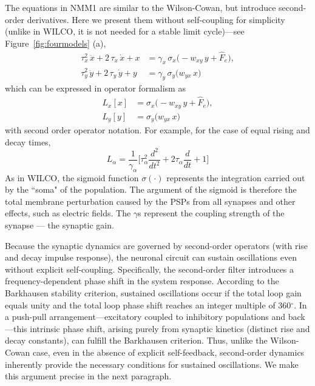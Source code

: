 \documentclass[12pt]{article}
\numberwithin{equation}{section}
\begin{document}
 
The equations in NMM1  are similar to the Wilson-Cowan, but introduce second-order derivatives. Here we present them without self-coupling for simplicity (unlike in WILCO, it is not needed for a stable limit cycle)---see Figure~\ref{fig:fourmodels} (a),
\begin{equation}
    \begin{aligned}
            \tau_x^{2}\,\ddot{x} + 2\,\tau_x\,\dot{x} +x
              &= \gamma_x\,\sigma_x\bigl(  - w_{xy}\,y + \hat F_e \bigr),\\
            \tau_y^{2}\,\ddot{y} + 2\,\tau_y\,\dot{y} +y
              &= \gamma_y\,\sigma_y\bigl(w_{yx}\,x  \bigr) 
          \end{aligned}
\end{equation}
which can be expressed in operator formalism as
\begin{equation} \label{eq:nmm1-simple}
    \begin{aligned}
            L_x[x]
              &= \sigma_x\bigl(  - w_{xy}\,y + \hat F_e \bigr),\\
           L_y[y] &= \sigma_y\bigl(w_{yx}\,x  \bigr) 
          \end{aligned}
\end{equation}
with second order operator notation. For example, for the case of equal rising and decay times, 
\begin{equation}\label{eq:L-operator-same-a}
L_\alpha = \frac{1}{\gamma_\alpha} \big [ \tau_\alpha^2 \frac{d^2}{dt^2} + 2 \tau_\alpha \frac{d}{dt} + 1 \big]
\end{equation}
As in WILCO, the sigmoid function $\sigma(\cdot)$ represents the integration carried out by the ``soma" of the population. The argument of the sigmoid is therefore the total membrane perturbation caused by the PSPs from all synapses and other effects, such as electric fields.  The  $\gamma$s represent the coupling strength of the synapse --- the synaptic gain.  


Because the synaptic dynamics are governed by second-order operators (with rise and decay impulse response), the neuronal circuit can sustain oscillations even without explicit self-coupling. Specifically, the second-order filter introduces a frequency-dependent phase shift in the system response. According to the Barkhausen stability criterion, sustained oscillations occur if the total loop gain equals unity and the total loop phase shift reaches an integer multiple of 360$^\circ$. In a push-pull arrangement—excitatory coupled to inhibitory populations and back—this intrinsic phase shift, arising purely from synaptic kinetics (distinct rise and decay constants), can fulfill the Barkhausen criterion. Thus, unlike the Wilson-Cowan case,  even in the absence of explicit self-feedback, second-order dynamics inherently provide the necessary conditions for sustained oscillations. We make this argument precise in the next paragraph.
\end{document}
